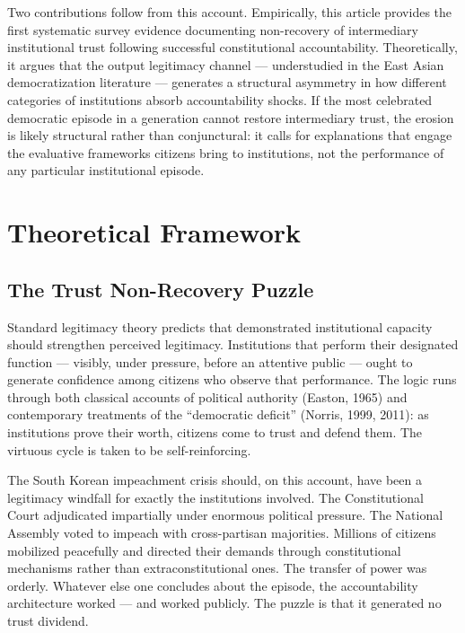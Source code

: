 \documentclass[
  12pt,
  letterpaper]{article}
\begin{document}
Two contributions follow from this account. Empirically, this article
provides the first systematic survey evidence documenting non-recovery
of intermediary institutional trust following successful constitutional
accountability. Theoretically, it argues that the output legitimacy
channel --- understudied in the East Asian democratization literature
--- generates a structural asymmetry in how different categories of
institutions absorb accountability shocks. If the most celebrated
democratic episode in a generation cannot restore intermediary trust,
the erosion is likely structural rather than conjunctural: it calls for
explanations that engage the evaluative frameworks citizens bring to
institutions, not the performance of any particular institutional
episode.

\section{Theoretical Framework}\label{theoretical-framework}

\subsection{The Trust Non-Recovery
Puzzle}\label{the-trust-non-recovery-puzzle}

Standard legitimacy theory predicts that demonstrated institutional
capacity should strengthen perceived legitimacy. Institutions that
perform their designated function --- visibly, under pressure, before an
attentive public --- ought to generate confidence among citizens who
observe that performance. The logic runs through both classical accounts
of political authority (Easton, 1965) and contemporary treatments of the
``democratic deficit'' (Norris, 1999, 2011): as institutions prove their
worth, citizens come to trust and defend them. The virtuous cycle is
taken to be self-reinforcing.

The South Korean impeachment crisis should, on this account, have been a
legitimacy windfall for exactly the institutions involved. The
Constitutional Court adjudicated impartially under enormous political
pressure. The National Assembly voted to impeach with cross-partisan
majorities. Millions of citizens mobilized peacefully and directed their
demands through constitutional mechanisms rather than
extraconstitutional ones. The transfer of power was orderly. Whatever
else one concludes about the episode, the accountability architecture
worked --- and worked publicly. The puzzle is that it generated no trust
dividend.
\end{document}
